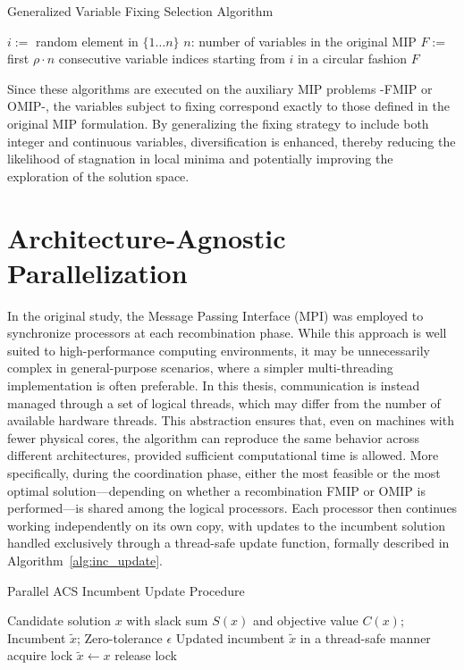 \begin{algorithm}[H]
\caption{Generalized Variable Fixing Selection Algorithm}\label{alg:gen_variable_fixing}
\begin{algorithmic}[1]
    \State $i :=$ random element in $\{1\dots n\}$ \Comment $n$: number of variables in the original MIP 
    \State $F :=$ first $\rho \cdot n$ consecutive  variable indices starting from $i$ in a circular fashion
    \State \Return $F$
\EndFunction
\end{algorithmic}
\end{algorithm}
Since these algorithms are executed on the auxiliary MIP problems -FMIP or OMIP-, the variables subject to fixing correspond exactly to those defined in the original MIP formulation.  
By generalizing the fixing strategy to include both integer and continuous variables, diversification is enhanced, thereby reducing the likelihood of stagnation in local minima and potentially improving the exploration of the solution space.

\section{Architecture-Agnostic Parallelization}
In the original study, the Message Passing Interface (MPI) was employed to synchronize processors at each recombination phase. While this approach is well suited to high-performance computing environments, it may be unnecessarily complex in general-purpose scenarios, where a simpler multi-threading implementation is often preferable.  
In this thesis, communication is instead managed through a set of logical threads, which may differ from the number of available hardware threads. This abstraction ensures that, even on machines with fewer physical cores, the algorithm can reproduce the same behavior across different architectures, provided sufficient computational time is allowed.  
More specifically, during the coordination phase, either the most feasible or the most optimal solution—depending on whether a recombination FMIP or OMIP is performed—is shared among the logical processors. Each processor then continues working independently on its own copy, with updates to the incumbent solution handled exclusively through a thread-safe update function, formally described in Algorithm~\ref{alg:inc_update}.  
\begin{algorithm}[H]
\caption{Parallel ACS Incumbent Update Procedure}\label{alg:inc_update}
\begin{algorithmic}[1]
\Require Candidate solution $x$ with slack sum $S(x)$ and objective value $C(x)$; Incumbent $\tilde{x}$; Zero-tolerance $\epsilon$
\Ensure Updated incumbent $\tilde{x}$ in a thread-safe manner
    \State acquire lock
        \State $\tilde{x} \gets x$
    \EndIf
    \State release lock
\EndFunction
\end{algorithmic}
\end{algorithm}

